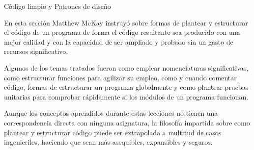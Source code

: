 \ReportSection
{Código limpio y Patrones de diseño}{}
{
    En esta sección Matthew McKay instruyó sobre formas de plantear y estructurar el código de un programa de forma el código resultante sea producido con una mejor calidad y con la capacidad de ser ampliado y probado sin un gasto de recursos significativo.
    
    Algunos de los temas tratados fueron como emplear nomenclaturas significativas, como estructurar funciones para agilizar su empleo, como y cuando comentar código, formas de estructurar un programa globalmente y como plantear pruebas unitarias para comprobar rápidamente si los módulos de un programa funcionan.
}
{
    Aunque los conceptos aprendidos durante estas lecciones no tienen una correspondencia directa con ninguna asignatura, la filosofía impartida sobre como plantear y estructurar código puede ser extrapolada a multitud de casos ingenieriles, haciendo que sean más asequibles, expansibles y seguros.
}

